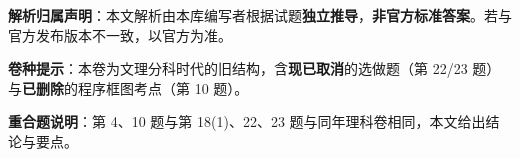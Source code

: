 

\begin{gknotice}
\textbf{ 解析归属声明}：本文解析由本库编写者根据试题\textbf{独立推导}，\textbf{非官方标准答案}。若与官方发布版本不一致，以官方为准。

\textbf{ 卷种提示}：本卷为文理分科时代的旧结构，含\textbf{现已取消}的选做题（第 22/23 题）与\textbf{已删除}的程序框图考点（第 10 题）。

\textbf{重合题说明}：第 4、10 题与第 18(1)、22、23 题与同年理科卷相同，本文给出结论与要点。
\end{gknotice}

\par\medskip


